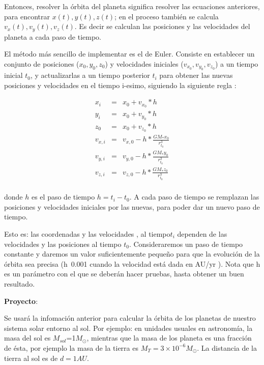\documentclass[a4paper,10pt]{article}
\begin{document}
\begin{enumerate}
Entonces, resolver la \'orbita del planeta significa  resolver las ecuaciones anteriores, para encontrar $x(t), y(t), z(t)$; en el proceso también se calcula  $v_x(t), v_y(t), v_z(t)$. Es decir se calculan las posiciones y las velocidades del planeta a cada paso de tiempo. 

 El método más sencillo de implementar es el de Euler. Consiste en establecer un conjunto de posiciones ($x_0, y_0, z_0$) y velocidades iniciales ($v_{x_0}, v_{y_0}, v_{z_0}$) a un tiempo inicial $t_0$, y actualizarlas a un tiempo  posterior  $t_{i}$ para obtener las nuevas posiciones y velocidades en el tiempo i-esimo, siguiendo la siguiente regla :

\begin{eqnarray}
x_i &=&x_0+v_{x_0}*h\\
y_i &=&x_0+v_{y_0}*h\\
z_0 &=&x_0+v_{z_0}*h\\
v_{x,i} &=&v_{x,0}-h*\frac{G M_{*} x_0}{r_{t_0}^3}\\
v_{y,i} &=&v_{y,0}-h*\frac{G M_{*} y_0}{r_{t_0}^3}\\
v_{z,i} &=&v_{z,0}-h*\frac{G M_{*} z_0}{r_{t_0}^3}\\
%
\end{eqnarray}

donde $h$ es el paso de tiempo $h=t_{i}-t_{0}$.  A cada paso de tiempo se remplazan las posiciones y velocidades iniciales por las nuevas, para poder dar un nuevo paso de tiempo. 

Esto es: las coordenadas y las velocidades , al tiempo$ t_{i}$ dependen de las velocidades y las posiciones al tiempo $t_{0}$. Consideraremos un paso de tiempo constante y daremos un valor suficientemente pequeño para que la evolución de la órbita sea precisa (h~0.001 cuando la velocidad está dada en AU/yr ). Nota que h es un par\'ametro con el que se deber\'an hacer pruebas, hasta obtener un buen resultado.

{\bf{Proyecto}}:

Se usar\'a la infomaci\'on anterior para calcular la \'orbita de los planetas de nuestro sistema solar entorno al sol. Por ejemplo: en unidades usuales en astronomía, la masa del sol es $M_{sol}$=1$M_{\odot}$, mientras que la masa de los planeta es una fracción  de \'esta, por ejemplo la masa de la tierra es  $M_{T}=3\times10^{-6} M_{\odot}$.  La distancia de la tierra al sol es de $d=1AU$. 


\end{enumerate}
\end{document}
